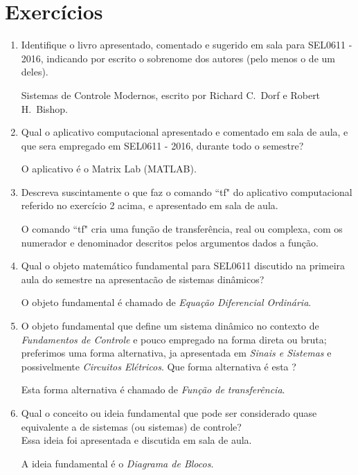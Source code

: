 \documentclass[12pt,a4paper]{article}
\begin{document}
\section*{Exercícios}
\begin{enumerate}
  \item Identifique o livro apresentado, comentado e sugerido em sala para SEL0611 - 2016,
indicando por escrito o sobrenome dos autores (pelo menos o de um deles).

Sistemas de Controle Modernos, escrito por Richard C.\ Dorf e Robert H.\ Bishop.

\item Qual o aplicativo computacional apresentado e comentado em sala de aula, e que
sera empregado em SEL0611 - 2016, durante todo o semestre?

O aplicativo é o Matrix Lab (MATLAB).

\item Descreva suscintamente o que faz o comando ``tf" do aplicativo computacional
  referido no exercício 2 acima, e apresentado em sala de aula.

  O comando ``tf" cria uma função de transferência, real ou complexa, com os numerador 
  e denominador descritos pelos argumentos dados a função.

\item Qual o objeto matemático fundamental para SEL0611 discutido na primeira aula 
  do semestre na apresentacão de sistemas dinâmicos? 

  O objeto fundamental é chamado de \emph{Equação Diferencial Ordinária}.

\item O objeto fundamental que define um sistema dinâmico no contexto de \emph{Fundamentos
    de Controle} e pouco empregado na forma direta ou bruta; preferimos uma forma 
  alternativa, ja apresentada em \emph{Sinais e Sistemas} e possivelmente \emph{Circuitos Elétricos}.
Que forma alternativa é esta ? 

Esta forma alternativa é chamado de \emph{Função de transferência}.

\item Qual o conceito ou ideia fundamental que pode ser considerado quase equivalente
a de sistemas (ou sistemas) de controle?\\ Essa ideia foi apresentada e discutida em
sala de aula.

A ideia fundamental é o \emph{Diagrama de Blocos}.
\end{enumerate}
\end{document}
